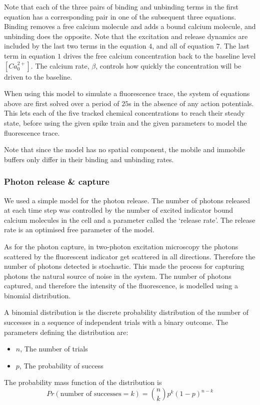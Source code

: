 \documentclass[a4paper,12pt]{article}
\theoremstyle{definition}
\begin{document}
Note that each of the three pairs of binding and unbinding terms in the first equation has a corresponding pair in one of the subsequent three equations. Binding removes a free calcium molecule and adds a bound calcium molecule, and unbinding does the opposite. Note that the excitation and release dynamics are included by the last two terms in the equation $4$, and all of equation $7$. The last term in equation $1$ drives the free calcium concentration back to the baseline level $[Ca^{2+}_{0}]$. The calcium rate, $\beta$, controls how quickly the concentration will be driven to the baseline.

When using this model to simulate a fluorescence trace, the system of equations above are first solved over a period of $25$s in the absence of any action potentials. This lets each of the five tracked chemical concentrations to reach their steady state, before using the given spike train and the given parameters to model the fluorescence trace.

Note that since the model has no spatial component, the mobile and immobile buffers only differ in their binding and unbinding rates.

\subsubsection{Photon release \& capture}\label{sec:photon_capture}
We used a simple model for the photon release. The number of photons released at each time step was controlled by the number of excited indicator bound calcium molecules in the cell and a parameter called the `release rate'. The release rate is an optimised free parameter of the model.

As for the photon capture, in two-photon excitation microscopy the photons scattered by the fluorescent indicator get scattered in all directions. Therefore the number of photons detected is stochastic. This made the process for capturing photons the natural source of noise in the system. The number of photons captured, and therefore the intensity of the fluorescence, is modelled using a binomial distribution.

A binomial distribution is the discrete probability distribution of the number of successes in a sequence of independent trials with a binary outcome. The parameters defining the distribution are:
\begin{itemize}
  \item $n$, The number of trials
  \item $p$, The probability of success
\end{itemize}
The probability mass function of the distribution is
\begin{equation}
  Pr(\text{number of successes} = k) = {{n}\choose{k}}p^k(1-p)^{n-k}
\end{equation}
\end{document}
